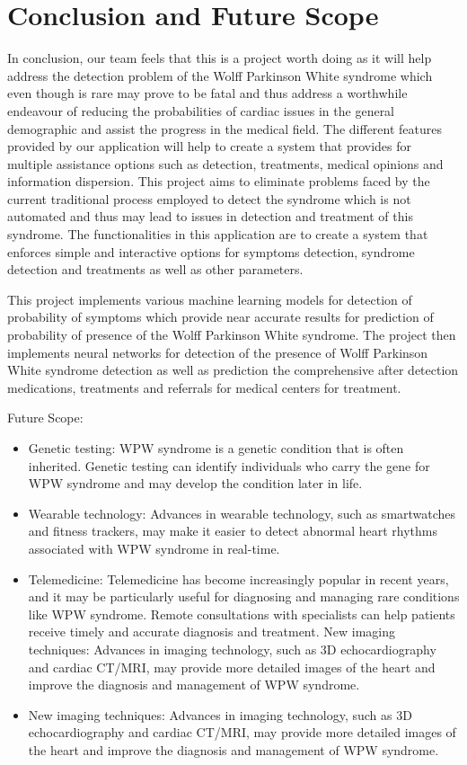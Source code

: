 \chapter{Conclusion and Future Scope}

In conclusion, our team feels that this is a project worth doing as it will help address the detection problem of the Wolff Parkinson White syndrome which even though is rare may prove to be fatal and thus address a worthwhile endeavour of reducing the probabilities of cardiac issues in the general demographic and assist the progress in the medical field. The different features provided by our application will help to create a system that provides for multiple assistance options such as detection, treatments, medical opinions and information dispersion. This project aims to eliminate problems faced by the current traditional process employed to detect the syndrome which is not automated and thus may lead to issues in detection and treatment of this syndrome. The functionalities in this application are to create a system that enforces simple and interactive options for symptoms detection, syndrome detection and treatments as well as other parameters.  

This project implements various machine learning models for detection of probability of symptoms which provide near accurate results for prediction of probability of presence of the Wolff Parkinson White syndrome. The project then implements neural networks for detection of the presence of Wolff Parkinson White syndrome detection as well as prediction the comprehensive after detection medications, treatments and referrals for medical centers for treatment.  

Future Scope:   
\begin{itemize}
	\item Genetic testing: WPW syndrome is a genetic condition that is often inherited. Genetic testing can identify individuals who carry the gene for WPW syndrome and may develop the condition later in life.  
	\item Wearable technology: Advances in wearable technology, such as smartwatches and fitness trackers, may make it easier to detect abnormal heart rhythms associated with WPW syndrome in real-time.
	\item Telemedicine: Telemedicine has become increasingly popular in recent years, and it may be particularly useful for diagnosing and managing rare conditions like WPW syndrome. Remote consultations with specialists can help patients receive timely and accurate diagnosis and treatment. New imaging techniques: Advances in imaging technology, such as 3D echocardiography and cardiac CT/MRI, may provide more detailed images of the heart and improve the diagnosis and management of WPW syndrome. 
	\item New imaging techniques: Advances in imaging technology, such as 3D echocardiography and cardiac CT/MRI, may provide more detailed images of the heart and improve the diagnosis and management of WPW syndrome. 
\end{itemize}

